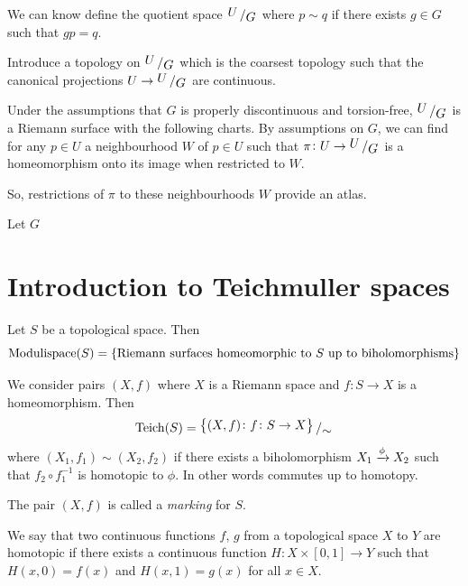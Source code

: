\documentclass[11pt,a4paper]{article}
\begin{document}
We can know define the quotient space $\bigslant{U}{G}$ where
$p \sim q$ if there exists $g \in G$ such that $gp = q$.

Introduce a topology on $\bigslant{U}{G}$ which is the coarsest topology
such that the canonical projections $U \to \bigslant{U}{G}$ are continuous.

Under the assumptions that $G$ is properly discontinuous and torsion-free,
$\bigslant{U}{G}$ is a Riemann surface with the following charts.
By assumptions on $G$, we can find for any $p \in U$ a neighbourhood $W$ of
$p \in U$ such that $\pi \colon U \to \bigslant{U}{G}$ is a homeomorphism
onto its image when restricted to $W$.

So, restrictions of $\pi$ to these neighbourhoods $W$ provide an atlas.

\begin{definition}
  Let $G$
\end{definition}

\newpage

\section{Introduction to Teichmuller spaces}
Let $S$ be a topological space.
Then
\[
  \mathrm{Modulispace}(S) = 
  \set{\text{Riemann surfaces homeomorphic to $S$ up to biholomorphisms}}
\]
\begin{definition}
  We consider pairs $(X,f)$ where $X$ is a Riemann space and
  $f \colon S \to X$ is a homeomorphism.
  Then
  \[
    \mathrm{Teich}(S) = 
    \bigslant{\set{(X,f) \colon f \colon S \to X}}{\sim}
  \]
  where $(X_1,f_1) \sim (X_2,f_2)$ if there exists a biholomorphism 
  $X_1 \xrightarrow{\phi} X_2$ such that $f_2 \circ f_1^{-1}$ is homotopic to
  $\phi$.
  In other words
  commutes up to homotopy.
\end{definition}

\begin{remark}
  The pair $(X,f)$ is called a \emph{marking} for $S$.
\end{remark}

\begin{definition}[Homotopy]
  We say that two continuous functions $f$, $g$ from a topological space $X$
  to $Y$ are homotopic if there exists a continuous function 
  $H \colon X \times [0,1] \to Y$ such that $H(x,0) = f(x)$ and
  $H(x,1) = g(x)$ for all $x \in X$.
\end{definition}
\end{document}
